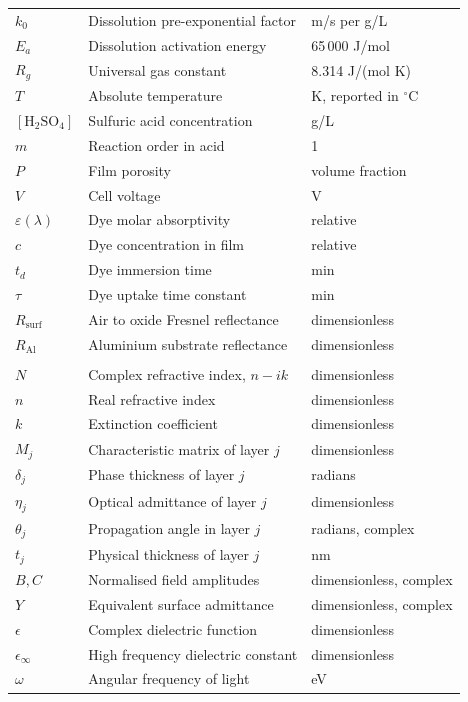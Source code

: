\documentclass[11pt,a4paper]{article}
\begin{document}
\begin{longtable}{@{}p{2.3cm}p{8.6cm}p{3.4cm}@{}}
$k_0$ & Dissolution pre-exponential factor & m/s per g/L \\
$E_a$ & Dissolution activation energy & 65\,000 J/mol \\
$R_g$ & Universal gas constant & 8.314 J/(mol K) \\
$T$ & Absolute temperature & K, reported in $^\circ$C \\
$[\mathrm{H_2SO_4}]$ & Sulfuric acid concentration & g/L \\
$m$ & Reaction order in acid & 1 \\
$P$ & Film porosity & volume fraction \\
$V$ & Cell voltage & V \\
$\varepsilon(\lambda)$ & Dye molar absorptivity & relative \\
$c$ & Dye concentration in film & relative \\
$t_d$ & Dye immersion time & min \\
$\tau$ & Dye uptake time constant & min \\
$R_\mathrm{surf}$ & Air to oxide Fresnel reflectance & dimensionless \\
$R_\mathrm{Al}$ & Aluminium substrate reflectance & dimensionless \\
\addlinespace
\multicolumn{3}{@{}l}{\textit{Thin film optics}}\\
$N$ & Complex refractive index, $n - ik$ & dimensionless \\
$n$ & Real refractive index & dimensionless \\
$k$ & Extinction coefficient & dimensionless \\
$M_j$ & Characteristic matrix of layer $j$ & dimensionless \\
$\delta_j$ & Phase thickness of layer $j$ & radians \\
$\eta_j$ & Optical admittance of layer $j$ & dimensionless \\
$\theta_j$ & Propagation angle in layer $j$ & radians, complex \\
$t_j$ & Physical thickness of layer $j$ & nm \\
$B, C$ & Normalised field amplitudes & dimensionless, complex \\
$Y$ & Equivalent surface admittance & dimensionless, complex \\
$\epsilon$ & Complex dielectric function & dimensionless \\
$\epsilon_\infty$ & High frequency dielectric constant & dimensionless \\
$\omega$ & Angular frequency of light & eV \\

\end{longtable}
\end{document}
